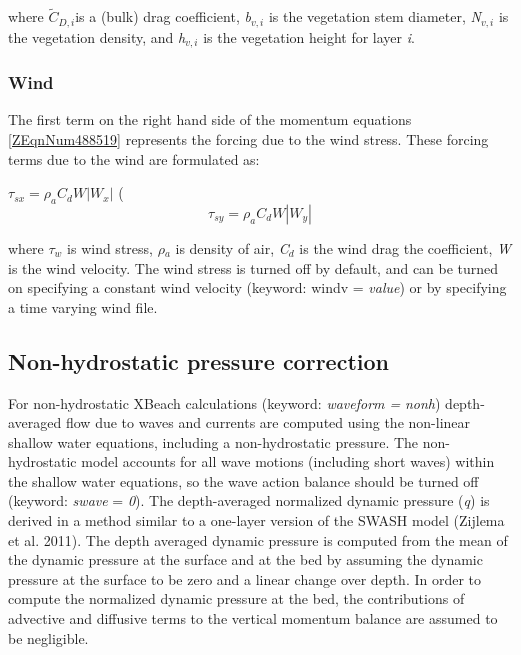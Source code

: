 \documentclass{article}
\begin{document}
\noindent where $\widetilde{C}_{D,i} $is a (bulk) drag coefficient, \textit{b${}_{v,i}$} is the vegetation stem diameter, \textit{N${}_{v,i}$} is the vegetation density, and \textit{h${}_{v,i}$ }is the vegetation height for layer \textit{i}.


\subsubsection{ Wind}

\noindent The first term on the right hand side of the momentum equations \eqref{ZEqnNum488519} represents the forcing due to the wind stress. These forcing terms due to the wind are formulated as:

\noindent 

 $\tau _{sx} =\rho _{a} C_{d} W\left|W_{x} \right|$  \label{2.59)}          (
\[\tau _{sy} =\rho _{a} C_{d} W\left|W_{y} \right|\] 


\noindent where \textit{$\tau $${}_{w}$} is wind stress, \textit{$\rho $${}_{a}$} is density of air, \textit{C${}_{d}$} is the wind drag the coefficient, \textit{W} is the wind velocity. The wind stress is turned off by default, and can be turned on specifying a constant wind velocity (keyword: windv = \textit{value}) or by specifying a time varying wind file.


\subsection{ Non-hydrostatic pressure correction}

\noindent For non-hydrostatic XBeach calculations (keyword: \textit{waveform =} \textit{nonh}) depth-averaged flow due to waves and currents are computed using the non-linear shallow water equations, including a non-hydrostatic pressure. The non-hydrostatic model accounts for all wave motions (including short waves) within the shallow water equations, so the wave action balance should be turned off (keyword: \textit{swave} = \textit{0}). The depth-averaged normalized dynamic pressure (\textit{q}) is derived in a method similar to a one-layer version of the SWASH model (Zijlema et al. 2011). The depth averaged dynamic pressure is computed from the mean of the dynamic pressure at the surface and at the bed by assuming the dynamic pressure at the surface to be zero and a linear change over depth. In order to compute the normalized dynamic pressure at the bed, the contributions of advective and diffusive terms to the vertical momentum balance are assumed to be negligible.
\end{document}
